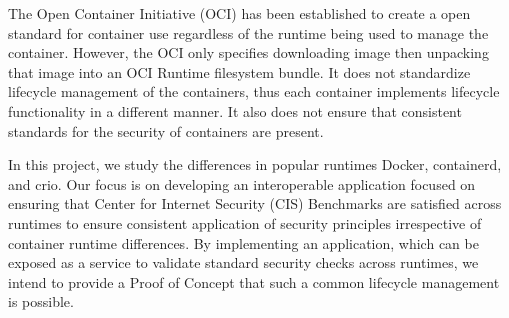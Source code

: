 The Open Container Initiative (OCI) has been established to create a open standard for container use regardless of the runtime being used to manage the container. However, the OCI only specifies downloading image then unpacking that image into an OCI Runtime filesystem bundle. It does not standardize lifecycle management of the containers, thus each container implements lifecycle functionality in a different manner. It also does not ensure that consistent standards for the security of containers are present.

In this project, we study the differences in popular runtimes Docker, containerd, and crio. Our focus is on developing an interoperable application focused on ensuring that Center for Internet Security (CIS) Benchmarks are satisfied across runtimes to ensure consistent application of security principles irrespective of container runtime differences. By implementing an application, which can be exposed as a service to validate standard security checks across runtimes, we intend to provide a Proof of Concept that such a common lifecycle management is possible.
